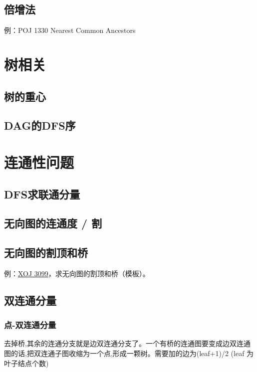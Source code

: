 \subsection{倍增法}
例：POJ 1330 Nearest Common Ancestors



\section{树相关}
\subsection{树的重心}


\subsection{DAG的DFS序}



\section{连通性问题}
\subsection{DFS求联通分量}


\subsection{无向图的连通度 / 割}


\subsection{无向图的割顶和桥}

例：\href{https://xoj.red/problems/show/3099}{XOJ 3099}，求无向图的割顶和桥（模板）。



\subsection{双连通分量}
\subsubsection{点-双连通分量}
去掉桥,其余的连通分支就是边双连通分支了。一个有桥的连通图要变成边双连通图的话,把双连通子图收缩为一个点,形成一颗树。需要加的边为(leaf+1)/2 (leaf 为叶子结点个数) 


